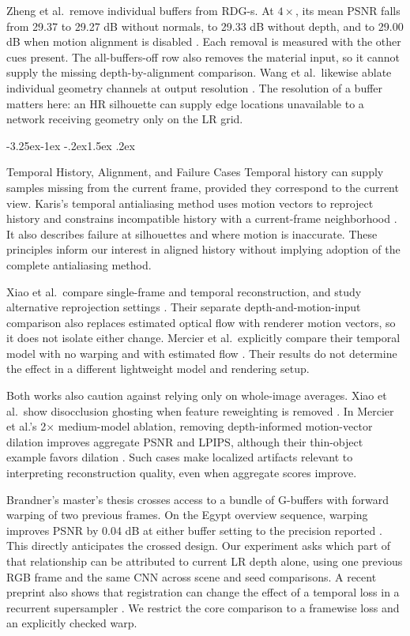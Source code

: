 \documentclass[11pt,a4paper]{article}
\makeatletter
\renewcommand\subsection{\@startsection{subsection}{2}{\z@}%
  {-3.25ex\@plus -1ex \@minus -.2ex}{1.5ex \@plus .2ex}%
  {\normalfont\large\bfseries\raggedright}}
\makeatother
\begin{document}
Zheng et al.\ remove individual buffers from RDG-s. At $4\times$,
its mean PSNR falls from 29.37 to 29.27 dB without normals, to
29.33 dB without depth, and to 29.00 dB when motion alignment is
disabled \cite[Table~3]{zheng2025rdg}. Each removal is measured with
the other cues present. The all-buffers-off row also removes the
material input, so it cannot supply the missing depth-by-alignment
comparison. Wang et al.\ likewise ablate individual geometry channels
at output resolution \cite{wang2025taming}. The resolution of a buffer
matters here: an HR silhouette can supply edge locations unavailable to
a network receiving geometry only on the LR grid.

\subsection{Temporal History, Alignment, and Failure Cases}
Temporal history can supply samples missing from the current frame, provided
they correspond to the current view. Karis's temporal antialiasing method
uses motion vectors to reproject history and constrains incompatible history
with a current-frame neighborhood \cite{karis2014high}. It also describes
failure at silhouettes and where motion is inaccurate. These principles
inform our interest in aligned history without implying adoption of the
complete antialiasing method.

Xiao et al.\ compare single-frame and temporal reconstruction, and study
alternative reprojection settings \cite{xiao2020neural}. Their separate
depth-and-motion-input comparison also replaces estimated optical flow with
renderer motion vectors, so it does not isolate either change. Mercier et
al.\ explicitly compare their temporal model with no warping and with
estimated flow \cite{mercier2023efficient}. Their results do not determine
the effect in a different lightweight model and rendering setup.

Both works also caution against relying only on whole-image averages. Xiao
et al.\ show disocclusion ghosting when feature reweighting is removed
\cite{xiao2020neural}. In Mercier et al.'s 2$\times$ medium-model ablation,
removing depth-informed motion-vector dilation improves aggregate PSNR and
LPIPS, although their thin-object example favors dilation
\cite{mercier2023efficient}. Such cases make localized artifacts relevant to
interpreting reconstruction quality, even when aggregate scores improve.

Brandner's master's thesis crosses access to a bundle of G-buffers with
forward warping of two previous frames. On the Egypt overview sequence,
warping improves PSNR by 0.04 dB at either buffer setting to the precision
reported \cite[Table~5.5]{brandner2024urtsr}. This directly anticipates
the crossed design. Our experiment asks which part of that relationship
can be attributed to current LR depth alone, using one previous RGB
frame and the same CNN across scene and seed comparisons. A recent
preprint also shows that registration can change the effect of a
temporal loss in a recurrent supersampler \cite{yu2026frozen}. We
restrict the core comparison to a framewise loss and an explicitly
checked warp.
\end{document}
